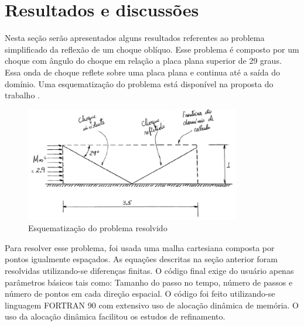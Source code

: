 \documentclass[a4paper, twoside, 12pt]{article}
\numberwithin{equation}{section}
\begin{document}
\section{Resultados e discussões}
Nesta seção serão apresentados alguns resultados referentes ao problema simplificado da reflexão de um choque oblíquo. Esse problema é composto por um choque com ângulo do choque em relação a placa plana superior de 29 graus. Essa onda de choque reflete sobre uma placa plana e continua até a saída do domínio. Uma esquematização do problema está disponível na proposta do trabalho \cite{AZEVEDO}.
        \begin{figure}[htb]
            \centering
            \includegraphics[width=.7\linewidth,height=50mm]{pics/shock.png}
            \caption{Esquematização do problema resolvido \cite{AZEVEDO}}
            \vspace*{-5pt}
        \end{figure}
Para resolver esse problema, foi usada uma malha cartesiana composta por pontos igualmente espaçados. As equações descritas na seção anterior foram resolvidas utilizando-se diferenças finitas. O código final exige do usuário apenas parâmetros básicos tais como: Tamanho do passo no tempo, número de passos e número de pontos em cada direção espacial. O código foi feito utilizando-se linguagem FORTRAN 90 com extensivo uso de alocação dinâmica de memória. O uso da alocação dinâmica facilitou os estudos de refinamento.
\end{document}
